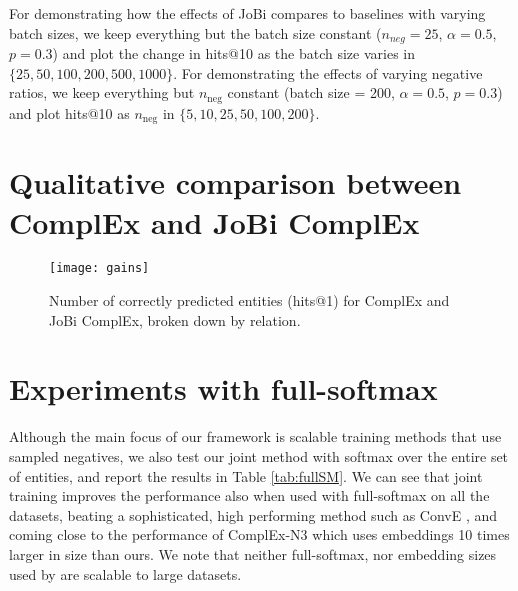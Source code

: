 \documentclass[11pt,a4paper, dvipsnames]{article}
\begin{document}
For demonstrating how the effects of JoBi compares to baselines with varying batch sizes, we keep everything but the batch size constant ($n_{neg}=25$, $\alpha= 0.5$, $p= 0.3$) and plot the change in hits@10 as the batch size varies in $\{25, 50, 100, 200, 500, 1000\}$. For demonstrating the effects of varying negative ratios, we keep everything but $n_{\text{neg}}$ constant (batch size = 200, $\alpha= 0.5$, $p= 0.3$) and plot hits@10 as $n_{\text{neg}}$ in $\{5, 10, 25, 50, 100, 200\}$.

\section{Qualitative comparison between ComplEx and JoBi ComplEx} \label{sec:gains}
\begin{figure}[h]
\texttt{[image: gains]}
\caption{Number of correctly predicted entities (hits@1) for ComplEx and JoBi ComplEx, broken down by relation.} 
\label{fig:gains}
\end{figure}










\section{Experiments with full-softmax}\label{sec:full-softmax}
Although the main focus of our framework is scalable training methods that use sampled negatives, we also test our joint method with softmax over the entire set of entities, and report the results in Table \ref{tab:fullSM}.
We can see that joint training improves the performance also when used with full-softmax on all the datasets,
beating a sophisticated, high performing method such as ConvE \cite{Dettmers2018ConvolutionalEmbeddings}, and coming close to the performance of ComplEx-N3 \citep{Lacroix2018CanonicalCompletion} which uses embeddings 10 times larger in size than ours. We note that neither full-softmax, nor embedding sizes used by \citet{Lacroix2018CanonicalCompletion} are scalable to large datasets. 
\end{document}
